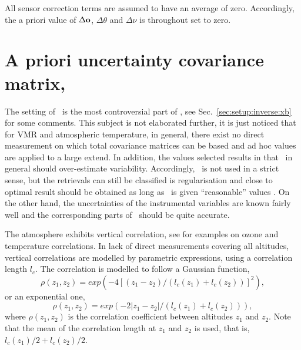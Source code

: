 All sensor correction terms are assumed to have an average of zero. Accordingly, the
a priori value of $\Delta\mathbf{o}$, $\Delta\theta$ and $\Delta\nu$ is
throughout set to zero.


\section{A priori uncertainty covariance matrix, }
\label{sec:Sa}
%
The setting of \ is the most controversial part of \OEM, see
Sec.~\ref{sec:setup:inverse:xb} for some comments. This subject is not
elaborated further, it is just noticed that for VMR and atmospheric
temperature, in general, there exist no direct measurement on which total
covariance matrices can be based and ad hoc values are applied to a large
extend. In addition, the values selected results in that \ in
general should over-estimate variability. Accordingly, \OEM\ is not used in a
strict sense, but the retrievals can still be classified is regularisation
\citep{ungermann2011tomographic} and close to optimal result should be obtained
as long as \ is given ``reasonable'' values
\citep{eriksson:analy:00}. On the other hand, the uncertainties of the
instrumental variables are known fairly well and the corresponding parts of
\ should be quite accurate.
\\
 

The atmosphere exhibits vertical correlation, see \citet{eriksson:stati:02} for
examples on ozone and temperature correlations. In lack of direct measurements
covering all altitudes, vertical correlations are modelled by parametric
expressions, using a correlation length $l_c$. The correlation is modelled to
follow a Gaussian function,
\begin{equation}
  \label{eq:corr:gau}
  \rho(z_1,z_2) = exp\left(-4[(z_1-z_2)/(l_c(z_1)+l_c(z_2))]^2\right),
\end{equation}
or an exponential one,
\begin{equation}
  \label{eq:corr:exp}
  \rho(z_1,z_2) = exp\left(-2\left|z_1-z_2\right|/(l_c(z_1)+l_c(z_2))\right),
\end{equation}
where $\rho(z_1,z_2)$ is the correlation coefficient between altitudes $z_1$
and $z_2$. Note that the mean of the correlation length at $z_1$ and $z_2$ is
used, that is,  $l_c(z_1)/2+l_c(z_2)/2$.

